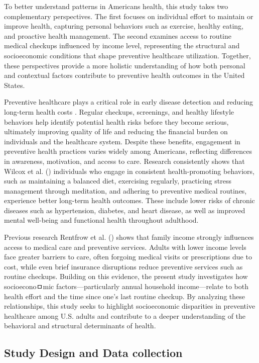 \documentclass[
  letterpaper,
  DIV=11,
  numbers=noendperiod]{scrartcl}
\begin{document}
To better understand patterns in Americans health, this study takes two
complementary perspectives. The first focuses on individual effort to
maintain or improve health, capturing personal behaviors such as
exercise, healthy eating, and proactive health management. The second
examines access to routine medical checkups influenced by income level,
representing the structural and socioeconomic conditions that shape
preventive healthcare utilization. Together, these perspectives provide
a more holistic understanding of how both personal and contextual
factors contribute to preventive health outcomes in the United States.

Preventive healthcare plays a critical role in early disease detection
and reducing long-term health costs . Regular checkups, screenings, and
healthy lifestyle behaviors help identify potential health risks before
they become serious, ultimately improving quality of life and reducing
the financial burden on individuals and the healthcare system. Despite
these benefits, engagement in preventive health practices varies widely
among Americans, reflecting differences in awareness, motivation, and
access to care. Research consistently shows that Wilcox et al.
() individuals who engage in consistent
health-promoting behaviors, such as maintaining a balanced diet,
exercising regularly, practicing stress management through meditation,
and adhering to preventive medical routines, experience better long-term
health outcomes. These include lower risks of chronic diseases such as
hypertension, diabetes, and heart disease, as well as improved mental
well-being and functional health throughout adulthood.

Previous research Rentfrow et al. ()
shows that family income strongly influences access to medical care and
preventive services. Adults with lower income levels face greater
barriers to care, often forgoing medical visits or prescriptions due to
cost, while even brief insurance disruptions reduce preventive services
such as routine checkups. Building on this evidence, the present study
investigates how socioeconoㅁmic factors---particularly annual household
income---relate to both health effort and the time since one's last
routine checkup. By analyzing these relationships, this study seeks to
highlight socioeconomic disparities in preventive healthcare among U.S.
adults and contribute to a deeper understanding of the behavioral and
structural determinants of health.

\subsection{Study Design and Data collection}\label{sec-design}
\end{document}
